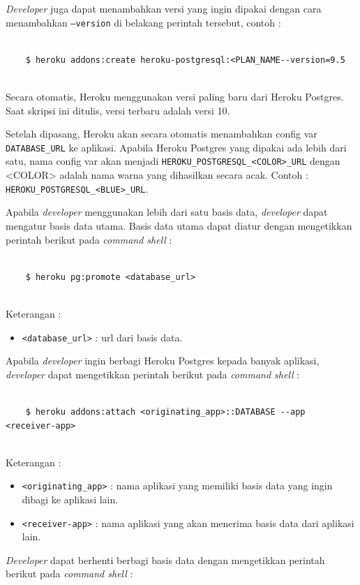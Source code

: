 \documentclass[a4paper,twoside]{article}
\begin{document}
\begin{enumerate}
\begin{enumerate}
\begin{itemize}
\textit{Developer} juga dapat menambahkan versi yang ingin dipakai dengan cara menambahkan \texttt{--version} di belakang perintah tersebut, contoh :
\begin{lstlisting}
	
	$ heroku addons:create heroku-postgresql:<PLAN_NAME--version=9.5
	
\end{lstlisting}
Secara otomatis, Heroku menggunakan versi paling baru dari Heroku Postgres. Saat skripsi ini ditulis, versi terbaru adalah versi 10.

Setelah dipasang, Heroku akan secara otomatis menambahkan config var \texttt{DATABASE\_URL} ke aplikasi. Apabila Heroku Postgres yang dipakai ada lebih dari satu, nama config var akan menjadi \texttt{HEROKU\_POSTGRESQL\_<COLOR>\_URL} dengan <COLOR> adalah nama warna yang dihasilkan secara acak. Contoh : \texttt{HEROKU\_POSTGRESQL\_<BLUE>\_URL}.

Apabila \textit{developer} menggunakan lebih dari satu basis data, \textit{developer} dapat mengatur basis data utama. Basis data utama dapat diatur dengan mengetikkan perintah berikut pada \textit{command shell} :
\begin{lstlisting}
	
	$ heroku pg:promote <database_url>
	
\end{lstlisting}
Keterangan :
\begin{itemize}
\item \texttt{<database\_url>} : url dari basis data.
\end{itemize}

Apabila \textit{developer} ingin berbagi Heroku Postgres kepada banyak aplikasi, \textit{developer} dapat mengetikkan perintah berikut pada \textit{command shell} : 
\begin{lstlisting}

	$ heroku addons:attach <originating_app>::DATABASE --app <receiver-app>
	
\end{lstlisting}
Keterangan :
\begin{itemize}
\item \texttt{<originating\_app>} : nama aplikasi yang memiliki basis data yang ingin dibagi ke aplikasi lain. 
\item \texttt{<receiver-app>} : nama aplikasi yang akan menerima basis data dari aplikasi lain.
\end{itemize}

\textit{Developer} dapat berhenti berbagi basis data dengan mengetikkan perintah berikut pada \textit{command shell} :
\begin{lstlisting}


\end{lstlisting}
\end{itemize}
\end{enumerate}
\end{enumerate}
\end{document}

